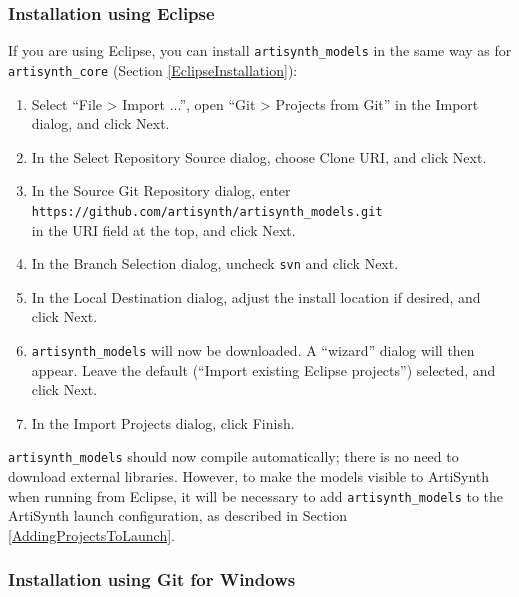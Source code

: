 \subsubsection{Installation using Eclipse}

If you are using Eclipse, you can install {\tt artisynth\_models} in
the same way as for {\tt artisynth\_core} (Section
\ref{EclipseInstallation}):

\begin{enumerate}

\item Select {\sf ``File > Import ...''}, open
{\sf ``Git > Projects from Git''} in the Import dialog,
and click {\sf Next}.

\item In the {\sf Select Repository Source}
dialog, choose {\sf Clone URI}, and click {\sf Next}.

\item In the {\sf Source Git Repository} dialog,
enter\\
{\tt https://github.com/artisynth/artisynth\_models.git}\\
in the {\sf URI} field at the top, and click {\sf Next}.

\item In the {\sf Branch Selection} dialog, uncheck {\tt svn}
and click {\sf Next}.

\item In the {\sf Local Destination} dialog,
adjust the install location if desired, and click {\sf Next}.

\item {\tt artisynth\_models} will now be downloaded.
A ``wizard'' dialog will
then appear. Leave the default ({\sf ``Import existing Eclipse
projects''}) selected, and click {\sf Next}.

\item In the {\sf Import Projects} dialog, click {\sf Finish}.

\end{enumerate}

{\tt artisynth\_models} should now compile automatically; there is no
need to download external libraries. However, to 
make the models visible to ArtiSynth when running from Eclipse, it
will be necessary to add {\tt artisynth\_models} to the ArtiSynth
launch configuration, as described in Section
\ref{AddingProjectsToLaunch}.

\ifWindows
\subsubsection{Installation using Git for Windows}

